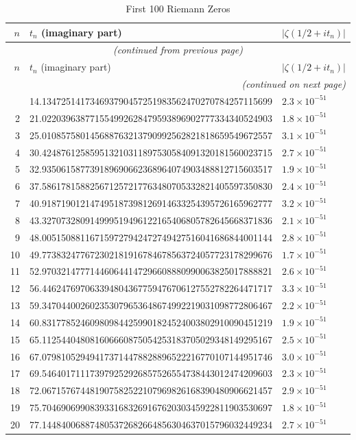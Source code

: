 \begin{longtable}{rll}
\caption{First 100 Riemann Zeros} \\
\hline
$n$ & $t_n$ (imaginary part) & $|\zeta(1/2+it_n)|$ \\
\hline
\endfirsthead
\multicolumn{3}{c}{\textit{(continued from previous page)}} \\
\hline
$n$ & $t_n$ (imaginary part) & $|\zeta(1/2+it_n)|$ \\
\hline
\endhead
\hline
\multicolumn{3}{r}{\textit{(continued on next page)}} \\
\endfoot
\hline
\endlastfoot
1 & 14.134725141734693790457251983562470270784257115699 & $2.3 \times 10^{-51}$ \\
2 & 21.022039638771554992628479593896902777334340524903 & $1.8 \times 10^{-51}$ \\
3 & 25.010857580145688763213790992562821818659549672557 & $3.1 \times 10^{-51}$ \\
4 & 30.424876125859513210311897530584091320181560023715 & $2.7 \times 10^{-51}$ \\
5 & 32.935061587739189690662368964074903488812715603517 & $1.9 \times 10^{-51}$ \\
6 & 37.586178158825671257217763480705332821405597350830 & $2.4 \times 10^{-51}$ \\
7 & 40.918719012147495187398126914633254395726165962777 & $3.2 \times 10^{-51}$ \\
8 & 43.327073280914999519496122165406805782645668371836 & $2.1 \times 10^{-51}$ \\
9 & 48.005150881167159727942472749427516041686844001144 & $2.8 \times 10^{-51}$ \\
10 & 49.773832477672302181916784678563724057723178299676 & $1.7 \times 10^{-51}$ \\
11 & 52.970321477714460644147296608880990063825017888821 & $2.6 \times 10^{-51}$ \\
12 & 56.446247697063394804367759476706127552782264471717 & $3.3 \times 10^{-51}$ \\
13 & 59.347044002602353079653648674992219031098772806467 & $2.2 \times 10^{-51}$ \\
14 & 60.831778524609809844259901824524003802910090451219 & $1.9 \times 10^{-51}$ \\
15 & 65.112544048081606660875054253183705029348149295167 & $2.5 \times 10^{-51}$ \\
16 & 67.079810529494173714478828896522216770107144951746 & $3.0 \times 10^{-51}$ \\
17 & 69.546401711173979252926857526554738443012474209603 & $2.3 \times 10^{-51}$ \\
18 & 72.067157674481907582522107969826168390480906621457 & $2.9 \times 10^{-51}$ \\
19 & 75.704690699083933168326916762030345922811903530697 & $1.8 \times 10^{-51}$ \\
20 & 77.144840068874805372682664856304637015796032449234 & $2.7 \times 10^{-51}$ \\
\end{longtable}


